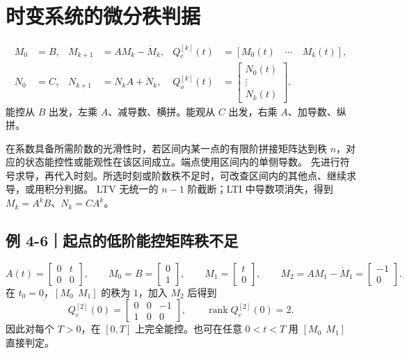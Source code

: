\documentclass[UTF8,a4paper,12pt,fontset=fandol]{ctexart}
\DeclareMathOperator{\rank}{rank}
\begin{document}
\newpage
\section{时变系统的微分秩判据}\label{sec:diff}

\begin{keybox}
\[
\begin{aligned}
 M_0&=B, & M_{k+1}&=AM_k-\dot M_k, &
 Q_c^{[k]}(t)&=[M_0(t)\quad \cdots\quad M_k(t)],\\[2pt]
 N_0&=C, & N_{k+1}&=N_kA+\dot N_k, &
 Q_o^{[k]}(t)&=\begin{bmatrix} N_0(t)\\ \vdots\\ N_k(t)\end{bmatrix}.
\end{aligned}
\]
能控从 $B$ 出发，左乘 $A$、减导数、横拼。能观从 $C$ 出发，右乘 $A$、加导数、纵拼。
\end{keybox}

在系数具备所需阶数的光滑性时，若区间内某一点的有限阶拼接矩阵达到秩 $n$，对应的状态能控性或能观性在该区间成立。端点使用区间内的单侧导数。
先进行符号求导，再代入时刻。所选时刻或阶数秩不足时，可改查区间内的其他点、继续求导，或用积分判据。
LTV 无统一的 $n-1$ 阶截断；LTI 中导数项消失，得到 $M_k=A^kB$、$N_k=CA^k$。

\subsection*{例 4-6｜起点的低阶能控矩阵秩不足}
\[
  A(t)=\begin{bmatrix}0&t\\0&0\end{bmatrix},\qquad
  M_0=B=\begin{bmatrix}0\\1\end{bmatrix},\qquad
  M_1=\begin{bmatrix}t\\0\end{bmatrix},\qquad
  M_2=AM_1-\dot M_1=\begin{bmatrix}-1\\0\end{bmatrix}.
\]
在 $t_0=0$，$[M_0\ \ M_1]$ 的秩为 $1$，加入 $M_2$ 后得到
\[
   Q_c^{[2]}(0)=\begin{bmatrix}0&0&-1\\1&0&0\end{bmatrix},
   \qquad \rank Q_c^{[2]}(0)=2 .
\]
因此对每个 $T>0$，在 $[0,T]$ 上完全能控。也可在任意 $0<t<T$ 用 $[M_0\ \ M_1]$ 直接判定。
\end{document}
